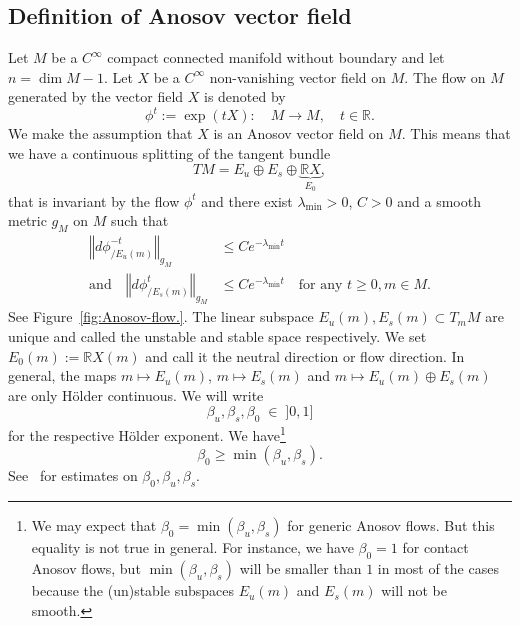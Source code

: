 \documentclass[10pt]{amsart}
\theoremstyle{definition}\newtheorem{defi}[theo]{Definition}\newtheorem{rema}[theo]{Remark}\newtheorem{exam}[theo]{Example}\newtheorem{exem}[theo]{Example}\newtheorem{nota}[theo]{Notation}
\newcommand{\bbR}{\mathbb{R}}
\begin{document}
\subsection{Definition of Anosov vector field}

Let $M$ be a $C^{\infty}$ compact connected manifold without boundary and let $n=\dim M-1$. Let $X$ be a $C^{\infty}$ non-vanishing vector field on $M$. The flow on $M$ generated by the vector field $X$ is denoted by
\begin{equation}\label{eq:flow_map}
\phi^{t}:=\exp\left(tX\right):\quad M\rightarrow M,\quad t\in\bbR.
\end{equation}
We make the assumption that $X$ is an Anosov vector field on $M$. This means that we have a continuous splitting of the tangent bundle
\begin{equation}\label{eq:decomp_TM}
TM=E_{u}\oplus E_{s}\oplus\underbrace{\bbR X}_{E_{0}},
\end{equation}
that is invariant by the flow $\phi^{t}$ and there exist $\lambda_{\min}>0$, $C>0$ and a smooth metric $g_{M}$ on $M$ such that
\begin{equation}\label{eq:hyperbolicity}
\begin{split}
\left\Vert d\phi_{/E_{u}\left(m\right)}^{-t}\right\Vert _{g_{M}} &\leq Ce^{-\lambda_{\min}t}\\
\text{and}\quad\left\Vert d\phi_{/E_{s}\left(m\right)}^{t}\right\Vert _{g_{M}} &\leq Ce^{-\lambda_{\min}t}\quad\text{for any }t\geq0,m\in M.
\end{split}
\end{equation}
See Figure~\ref{fig:Anosov-flow.}. The linear subspace $E_{u}(m),E_{s}(m)\subset T_{m}M$ are unique and called the unstable and stable space respectively. We set $E_{0}(m):=\bbR X(m)$ and call it the neutral direction or flow direction. In general, the maps $m\mapsto E_{u}(m)$, $m\mapsto E_{s}(m)$ and $m\mapsto E_{u}(m)\oplus E_{s}(m)$ are only H\"older continuous. We will write
\begin{equation}\label{eq:Holder_exp}
\beta_{u},\beta_{s},\beta_{0}\;\in\;]0,1]
\end{equation}
for the respective H\"older exponent. We have\footnote{We may expect that $\beta_{0}=\min(\beta_{u},\beta_{s})$ for generic Anosov flows. But this equality is not true in general. For instance, we have $\beta_{0}=1$ for contact Anosov flows, but $\min(\beta_{u},\beta_{s})$ will be smaller than $1$ in most of the cases because the (un)stable subspaces $E_{u}(m)$ and $E_{s}(m)$ will not be smooth.}
\begin{equation}\label{eq:def_beta_*}
\beta_{0}\geq\min\left(\beta_{u},\beta_{s}\right).
\end{equation}
See~\cite{hasselblatt1994regularity,hurder-90} for estimates on $\beta_{0},\beta_{u},\beta_{s}$.
\end{document}
